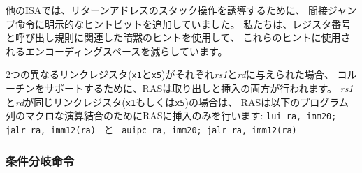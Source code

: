 \begin{commentary}
\begin{comment}
Some other ISAs added explicit hint bits to their indirect-jump instructions
to guide return-address stack manipulation.  We use implicit hinting tied to
register numbers and the calling convention to reduce the encoding space used
for these hints.
\end{comment}
他のISAでは、リターンアドレスのスタック操作を誘導するために、
間接ジャンプ命令に明示的なヒントビットを追加していました。 
私たちは、レジスタ番号と呼び出し規則に関連した暗黙のヒントを使用して、
これらのヒントに使用されるエンコーディングスペースを減らしています。

\begin{comment}
When two different link registers ({\tt x1} and {\tt x5}) are given as
{\em rs1} and {\em rd}, then the RAS is both popped and pushed to
support coroutines.  If {\em rs1} and {\em rd} are the same link
register (either {\tt x1} or {\tt x5}), the RAS is only pushed to
enable macro-op fusion of the sequences:\linebreak
{\tt lui ra, imm20; jalr ra, imm12(ra)} \ and \ 
{\tt auipc ra, imm20; jalr ra, imm12(ra)}
\end{comment}

2つの異なるリンクレジスタ({\tt x1}と{\tt x5})がそれぞれ{\em rs1}と{\em rd}に与えられた場合、
コルーチンをサポートするために、RASは取り出しと挿入の両方が行われます。
{\em rs1}と{\em rd}が同じリンクレジスタ({\tt x1}もしくは{\tt x5})の場合は、
RASは以下のプログラム列のマクロな演算結合のためにRASに挿入のみを行います:
\linebreak
{\tt lui ra, imm20; jalr ra, imm12(ra)} \ と \ 
{\tt auipc ra, imm20; jalr ra, imm12(ra)}
\end{commentary}

\begin{comment}
\subsubsection*{Conditional Branches}
\end{comment}
\subsubsection*{条件分岐命令}

\begin{comment}
All branch instructions use the B-type instruction format.  The
12-bit B-immediate encodes signed offsets in multiples of 2 bytes.
The offset is sign-extended and added
to the address of the branch instruction to give the target address.  The
conditional branch range is $\pm$\wunits{4}{KiB}.
\end{comment}

